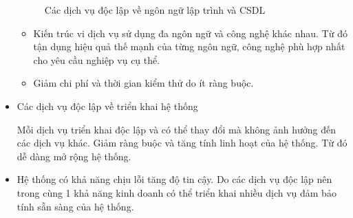 \begin{itemize}
\begin{figure}[h]
              \caption{Các dịch vụ độc lập về ngôn ngữ lập trình và CSDL}

          \end{figure}

          \begin{itemize}

              \item Kiến trúc vi dịch vụ sử dụng đa ngôn ngữ và công nghệ khác nhau. Từ đó tận dụng hiệu quả thế mạnh của từng ngôn ngữ, công nghệ phù hợp nhất cho yêu cầu nghiệp vụ cụ thể.

              \item Giảm chi phí và thời gian kiểm thử do ít ràng buộc.

          \end{itemize}


    \item Các dịch vụ độc lập về        triển khai hệ thống

          Mỗi dịch vụ triển khai độc lập và có thể       thay đổi mà không ảnh hưởng đến các dịch vụ khác.
          Giảm   ràng buộc   và tăng tính linh hoạt của hệ thống.           Từ đó dễ dàng mở rộng hệ thống.
    \item  Hệ thống có khả năng chịu lỗi   tăng độ tin cậy.
          Do    các dịch vụ độc lập nên trong cùng 1 khả năng kinh doanh có thể triển khai nhiều dịch vụ đảm bảo tính sẵn sàng của hệ thống.
\end{itemize}








